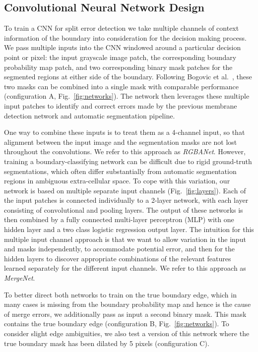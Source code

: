 \subsection{Convolutional Neural Network Design}
To train a CNN for split error detection we take multiple channels of context information of the boundary into consideration for the decision making process. We pass multiple inputs into the CNN windowed around a particular decision point or pixel: the input grayscale image patch, the corresponding boundary probability map patch, and two corresponding binary mask patches for the segmented regions at either side of the boundary. Following Bogovic et al.~\cite{BogovicHJ13}, these two masks can be combined into a single mask with comparable performance (configuration A, Fig.~\ref{fig:networks}). The network then leverages these multiple input patches to identify and correct errors made by the previous membrane detection network and automatic segmentation pipeline.

One way to combine these inputs is to treat them as a 4-channel input, so that alignment between the input image and the segmentation masks are not lost throughout the convolutions. We refer to this approach as \textit{RGBANet}. However, training a boundary-classifying network can be difficult due to rigid ground-truth segmentations, which often differ substantially from automatic segmentation regions in ambiguous extra-cellular space. To cope with this variation, our network is based on multiple separate input channels (Fig.~\ref{fig:layers}). Each of the input patches is connected individually to a 2-layer network, with each layer consisting of convolutional and pooling layers. The output of these networks is then combined by a fully connected multi-layer perceptron (MLP) with one hidden layer and a two class logistic regression output layer. The intuition for this multiple input channel approach is that we want to allow variation in the input and masks independently, to accommodate potential error, and then for the hidden layers to discover appropriate combinations of the relevant features learned separately for the different input channels. We refer to this approach as \textit{MergeNet}.

To better direct both networks to train on the true boundary edge, which in many cases is missing from the boundary probability map and hence is the cause of merge errors, we additionally pass as input a second binary mask. This mask contains the true boundary edge (configuration B, Fig.~\ref{fig:networks}). To consider slight edge ambiguities, we also test a version of this network where the true boundary mask has been dilated by 5 pixels (configuration C).

